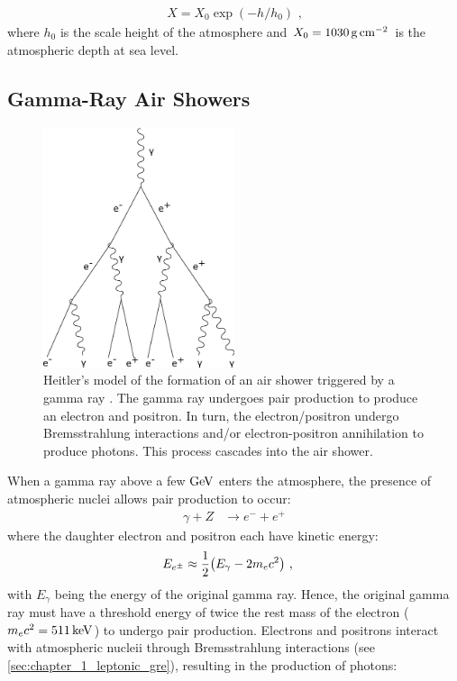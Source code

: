 \begin{equation}
    \begin{aligned}
    X=X_0\exp(-h/h_0)\text{ ,}
    \end{aligned}
\end{equation}
where $h_0$ is the scale height of the atmosphere and $X_0=1030\,\si{\gram\per\centi\meter\squared}$ is the atmospheric depth at sea level. 

\subsection{Gamma-Ray Air Showers} \label{sec:05_air_shower_gamma_ray}
\begin{figure}
    \includegraphics[width=0.5\textwidth]{05_Astronomy/Images/air_shower/gamma_ray.pdf}
    \caption{Heitler's model of the formation of an air shower triggered by a gamma ray \citep{1954qtr..book.....H}. The gamma ray undergoes pair production to produce an electron and positron. In turn, the electron/positron undergo Bremsstrahlung interactions and/or electron-positron annihilation to produce photons. This process cascades into the air shower.}
    \label{fig:chapter_2_air_shower_em}
\end{figure}
When a gamma ray above a few $\si{\giga\electronvolt}$ enters the atmosphere, the presence of atmospheric nuclei allows pair production to occur:
\begin{equation}
    \begin{aligned}
    \gamma + Z &\rightarrow e^- + e^+
    \end{aligned}
\end{equation}
\noindent where the daughter electron and positron each have kinetic energy:
\begin{equation}
    \begin{aligned}
    E_{e^\pm}&\approx \frac{1}{2}\qty(E_\gamma-2m_ec^2)\text{ ,}
    \end{aligned} \label{eq:05_gamma_astrom_pair_condition}
\end{equation}
\noindent with $E_\gamma$ being the energy of the original gamma ray. Hence, the original gamma ray must have a threshold energy of twice the rest mass of the electron ($m_ec^2=511\,\si{\kilo\electronvolt}$) to undergo pair production.
\newpar
Electrons and positrons interact with atmospheric nucleii through Bremsstrahlung interactions (see \autoref{sec:chapter_1_leptonic_gre}), resulting in the production of photons:

